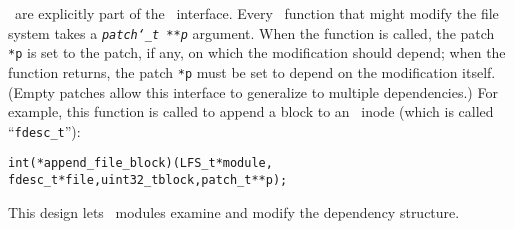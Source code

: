 \Patches\ are explicitly part of the \LFS\ interface.
%
Every \LFS\ function that might modify the file system takes a
\texttt{\textit{patch\char`\_t **p}} argument.
%
When the function is called, the patch \texttt{*p} is set to the patch, if
any, on which the modification should depend;
%
when the function returns, the patch \texttt{*p} must be set to depend on
the modification itself.
%
(Empty patches allow this interface to generalize to multiple
dependencies.)
%
For example, this function is called to append a block to an \LFS\ inode
(which is called ``\verb+fdesc_t+''):

\begin{small}
\begin{alltt}
int (*append_file_block)(LFS_t *module, 
   fdesc_t *file, uint32_t block, patch_t **p);
\end{alltt}
\end{small}

\noindent%
This design lets \LFS\ modules examine and modify the dependency structure.
